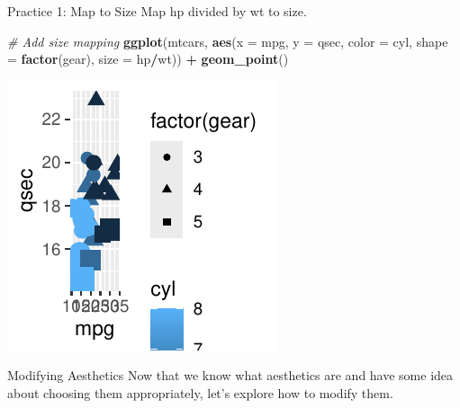 \documentclass[
  ignorenonframetext,
]{beamer}
\newenvironment{Shaded}{\begin{snugshade}}{\end{snugshade}}
\newcommand{\AttributeTok}[1]{\textcolor[rgb]{0.13,0.29,0.53}{#1}}
\newcommand{\CommentTok}[1]{\textcolor[rgb]{0.56,0.35,0.01}{\textit{#1}}}
\newcommand{\FunctionTok}[1]{\textcolor[rgb]{0.13,0.29,0.53}{\textbf{#1}}}
\newcommand{\NormalTok}[1]{#1}
\newcommand{\SpecialCharTok}[1]{\textcolor[rgb]{0.81,0.36,0.00}{\textbf{#1}}}
\begin{document}
\begin{frame}[fragile]{Practice 1: Map to Size}
\label{practice-1-map-to-size}
Map hp divided by wt to size.


\begin{Shaded}
\begin{Highlighting}[]
\CommentTok{\# Add size mapping}
\FunctionTok{ggplot}\NormalTok{(mtcars, }\FunctionTok{aes}\NormalTok{(}\AttributeTok{x =}\NormalTok{ mpg, }\AttributeTok{y =}\NormalTok{ qsec, }\AttributeTok{color =}\NormalTok{ cyl, }\AttributeTok{shape =} \FunctionTok{factor}\NormalTok{(gear),}
    \AttributeTok{size =}\NormalTok{ hp}\SpecialCharTok{/}\NormalTok{wt)) }\SpecialCharTok{+} \FunctionTok{geom\_point}\NormalTok{()}
\end{Highlighting}
\end{Shaded}

\begin{center}\includegraphics[width=0.5\linewidth]{Figs/unnamed-chunk-27-1} \end{center}
\end{frame}

\begin{frame}{Modifying Aesthetics}
\label{modifying-aesthetics}
Now that we know what aesthetics are and have some idea about choosing
them appropriately, let's explore how to modify them.
\end{frame}
\end{document}
